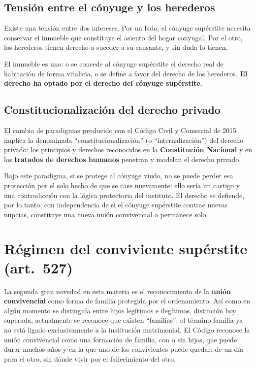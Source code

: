\documentclass[12pt,oneside]{book}
\begin{document}
\subsection{Tensión entre el cónyuge y los herederos}

Existe una tensión entre dos intereses. Por un lado, el cónyuge supérstite necesita conservar el inmueble que constituye el asiento del hogar conyugal. Por el otro, los herederos tienen derecho a suceder a su causante, y sin duda lo tienen.

\begin{importante}
El inmueble es uno: o se concede al cónyuge supérstite el derecho real de habitación de forma vitalicia, o se define a favor del derecho de los herederos. \textbf{El derecho ha optado por el derecho del cónyuge supérstite.}
\end{importante}

\subsection{Constitucionalización del derecho privado}

El cambio de paradigmas producido con el Código Civil y Comercial de 2015 implica la denominada ``constitucionalización'' (o ``internalización'') del derecho privado: los principios y derechos reconocidos en la \textbf{Constitución Nacional} y en los \textbf{tratados de derechos humanos} penetran y modelan el derecho privado.

Bajo este paradigma, si se protege al cónyuge viudo, no se puede perder esa protección por el solo hecho de que se case nuevamente: ello sería un castigo y una contradicción con la lógica protectoria del instituto. El derecho se defiende, por lo tanto, con independencia de si el cónyuge supérstite contrae nuevas nupcias, constituye una nueva unión convivencial o permanece solo.

\section{Régimen del conviviente supérstite (art.~527)}

La segunda gran novedad en esta materia es el reconocimiento de la \textbf{unión convivencial} como forma de familia protegida por el ordenamiento. Así como en algún momento se distinguía entre hijos legítimos e ilegítimos, distinción hoy superada, actualmente se reconoce que existen ``familias'': el término familia ya no está ligado exclusivamente a la institución matrimonial. El Código reconoce la unión convivencial como una formación de familia, con o sin hijos, que puede durar muchos años y en la que uno de los convivientes puede quedar, de un día para el otro, sin dónde vivir por el fallecimiento del otro.
\end{document}
